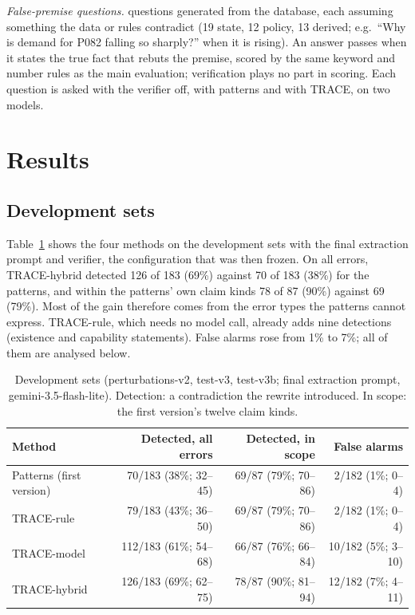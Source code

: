 \documentclass[journal]{IEEEtran}
\renewcommand{\paragraph}[1]{\par\textit{#1}\enspace}
\begin{document}
\paragraph{False-premise questions.} 44 questions generated from the database, each assuming something the
data or rules contradict \cite{hu2023falseqa} (19 state, 12 policy, 13 derived; e.g.\ ``Why is demand for
P082 falling so sharply?'' when it is rising). An answer passes when it states the true fact that rebuts the
premise, scored by the same keyword and number rules as the main evaluation; verification plays no part in
scoring. Each question is asked with the verifier off, with patterns and with TRACE, on two models.

\section{Results}
\label{sec:results}

\subsection{Development sets}

Table~\ref{tab:dev} shows the four methods on the development sets with the final extraction prompt and
verifier, the configuration that was then frozen. On all errors, TRACE-hybrid detected 126 of 183 (69\%)
against 70 of 183 (38\%) for the patterns, and within the patterns' own claim kinds 78 of 87 (90\%) against
69 (79\%). Most of the gain therefore comes from the error types the patterns cannot express. TRACE-rule,
which needs no model call, already adds nine detections (existence and capability statements). False alarms
rose from 1\% to 7\%; all of them are analysed below.

\begin{table}[t]
\centering\small
\caption{Development sets (perturbations-v2, test-v3, test-v3b; final extraction prompt, gemini-3.5-flash-lite).
Detection: a contradiction the rewrite introduced. In scope: the first version's twelve claim kinds.}
\label{tab:dev}
\begin{tabular}{@{}lrrr@{}}
\toprule
Method & Detected, all errors & Detected, in scope & False alarms \\
\midrule
Patterns (first version) & 70/183 (38\%; 32--45) & 69/87 (79\%; 70--86) & 2/182 (1\%; 0--4) \\
TRACE-rule & 79/183 (43\%; 36--50) & 69/87 (79\%; 70--86) & 2/182 (1\%; 0--4) \\
TRACE-model & 112/183 (61\%; 54--68) & 66/87 (76\%; 66--84) & 10/182 (5\%; 3--10) \\
TRACE-hybrid & 126/183 (69\%; 62--75) & 78/87 (90\%; 81--94) & 12/182 (7\%; 4--11) \\
\bottomrule
\end{tabular}
\end{table}
\end{document}
